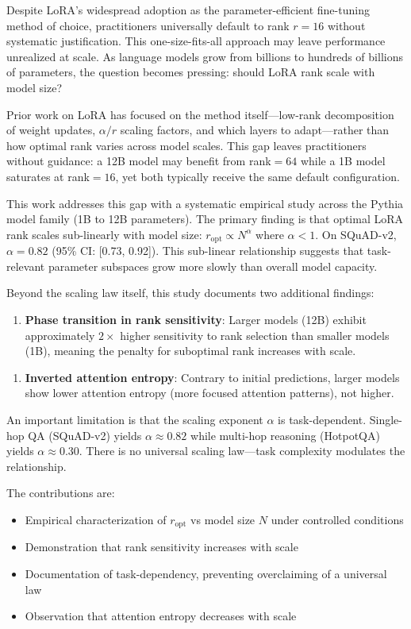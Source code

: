 
Despite LoRA's widespread adoption as the parameter-efficient fine-tuning method of choice, practitioners universally default to rank $r=16$ without systematic justification. This one-size-fits-all approach may leave performance unrealized at scale. As language models grow from billions to hundreds of billions of parameters, the question becomes pressing: should LoRA rank scale with model size?

Prior work on LoRA has focused on the method itself---low-rank decomposition of weight updates, $\alpha /r$ scaling factors, and which layers to adapt---rather than how optimal rank varies across model scales. This gap leaves practitioners without guidance: a 12B model may benefit from rank$=64$ while a 1B model saturates at rank$=16$, yet both typically receive the same default configuration.

This work addresses this gap with a systematic empirical study across the Pythia model family (1B to 12B parameters). The primary finding is that optimal LoRA rank scales sub-linearly with model size: $r_{\text{opt}} \propto N^{\alpha}$ where $\alpha < 1$. On SQuAD-v2, $\alpha = 0.82$ (95\% CI: [0.73, 0.92]). This sub-linear relationship suggests that task-relevant parameter subspaces grow more slowly than overall model capacity.

Beyond the scaling law itself, this study documents two additional findings:

\begin{enumerate}
\item \textbf{Phase transition in rank sensitivity}: Larger models (12B) exhibit approximately $2\times$ higher sensitivity to rank selection than smaller models (1B), meaning the penalty for suboptimal rank increases with scale.
\end{enumerate}

\begin{enumerate}
\item \textbf{Inverted attention entropy}: Contrary to initial predictions, larger models show lower attention entropy (more focused attention patterns), not higher.
\end{enumerate}

An important limitation is that the scaling exponent $\alpha$ is task-dependent. Single-hop QA (SQuAD-v2) yields $\alpha \approx 0.82$ while multi-hop reasoning (HotpotQA) yields $\alpha \approx 0.30$. There is no universal scaling law---task complexity modulates the relationship.

The contributions are:

\begin{itemize}
\item Empirical characterization of $r_{\text{opt}}$ vs model size $N$ under controlled conditions
\item Demonstration that rank sensitivity increases with scale
\item Documentation of task-dependency, preventing overclaiming of a universal law
\item Observation that attention entropy decreases with scale
\end{itemize}
